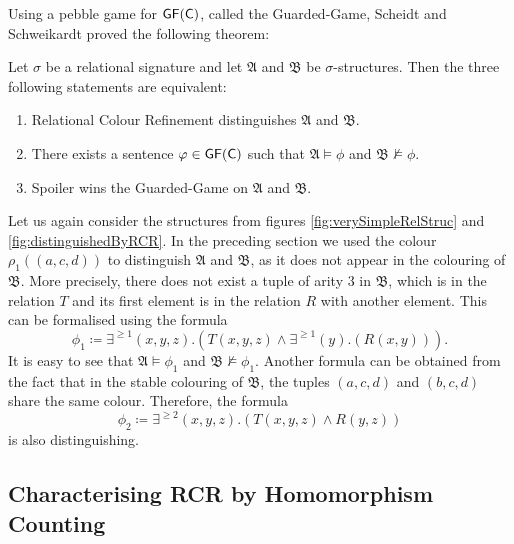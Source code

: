 Using a pebble game for $\mathsf{GF}(\mathsf{C})$, called the Guarded-Game, Scheidt and Schweikardt proved the following theorem:
\begin{theorem}
	Let $\sigma$ be a relational signature and let $\mathfrak A$ and $\mathfrak B$ be $\sigma$-structures.
	Then the three following statements are equivalent:
	\begin{enumerate}
		\item Relational Colour Refinement distinguishes $\mathfrak A$ and $\mathfrak B$.
		\item There exists a sentence $\varphi\in \mathsf{GF}(\mathsf{C})$ such that $\mathfrak A\models \phi$ and $\mathfrak B\not\models\phi$.
		\item Spoiler wins the Guarded-Game on $\mathfrak A$ and $\mathfrak B$.
	\end{enumerate}
\end{theorem}
Let us again consider the structures from figures \ref{fig:verySimpleRelStruc} and \ref{fig:distinguishedByRCR}.
In the preceding section we used the colour $\rho_1((a,c,d))$ to distinguish $\mathfrak A$ and $\mathfrak B$, as it does not appear in the colouring of $\mathfrak B$.
More precisely, there does not exist a tuple of arity $3$ in $\mathfrak B$, which is in the relation $T$ and its first element is in the relation $R$ with another element.
This can be formalised using the formula
$$\phi_1\coloneqq\exists^{\geq 1}(x,y,z).\left(T(x,y,z)\land \exists^{\geq 1} (y).\left( R(x,y)\right)\right).$$
It is easy to see that $\mathfrak A\models \phi_1$ and $\mathfrak B\not\models \phi_1$.
Another formula can be obtained from the fact that in the stable colouring of $\mathfrak B$, the tuples $(a,c,d)$ and $(b,c,d)$ share the same colour.
Therefore, the formula
$$\phi_2\coloneqq \exists^{\geq 2}(x,y,z).\left(T(x,y,z)\land R(y,z)\right)$$
is also distinguishing.

\subsection{Characterising RCR by Homomorphism Counting}

